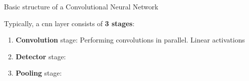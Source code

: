 %
%
%

\begin{frame}[t]{Basic structure of a Convolutional Neural Network}

    Typically, a \gls{cnn} layer
    consists of {\bf 3 stages}:
    \begin{enumerate}
        \item {\bf Convolution} stage:
           Performing convolutions in parallel. 
           Linear activations           
        \item {\bf Detector} stage:
        \item {\bf Pooling} stage:
    \end{enumerate}

\end{frame}

